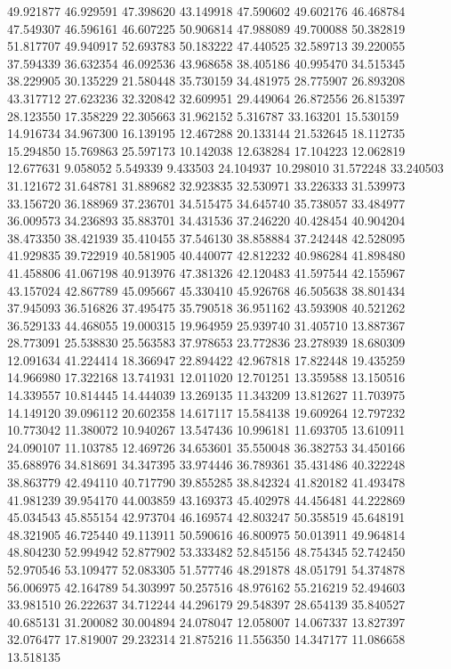49.921877
46.929591
47.398620
43.149918
47.590602
49.602176
46.468784
47.549307
46.596161
46.607225
50.906814
47.988089
49.700088
50.382819
51.817707
49.940917
52.693783
50.183222
47.440525
32.589713
39.220055
37.594339
36.632354
46.092536
43.968658
38.405186
40.995470
34.515345
38.229905
30.135229
21.580448
35.730159
34.481975
28.775907
26.893208
43.317712
27.623236
32.320842
32.609951
29.449064
26.872556
26.815397
28.123550
17.358229
22.305663
31.962152
5.316787
33.163201
15.530159
14.916734
34.967300
16.139195
12.467288
20.133144
21.532645
18.112735
15.294850
15.769863
25.597173
10.142038
12.638284
17.104223
12.062819
12.677631
9.058052
5.549339
9.433503
24.104937
10.298010
31.572248
33.240503
31.121672
31.648781
31.889682
32.923835
32.530971
33.226333
31.539973
33.156720
36.188969
37.236701
34.515475
34.645740
35.738057
33.484977
36.009573
34.236893
35.883701
34.431536
37.246220
40.428454
40.904204
38.473350
38.421939
35.410455
37.546130
38.858884
37.242448
42.528095
41.929835
39.722919
40.581905
40.440077
42.812232
40.986284
41.898480
41.458806
41.067198
40.913976
47.381326
42.120483
41.597544
42.155967
43.157024
42.867789
45.095667
45.330410
45.926768
46.505638
38.801434
37.945093
36.516826
37.495475
35.790518
36.951162
43.593908
40.521262
36.529133
44.468055
19.000315
19.964959
25.939740
31.405710
13.887367
28.773091
25.538830
25.563583
37.978653
23.772836
23.278939
18.680309
12.091634
41.224414
18.366947
22.894422
42.967818
17.822448
19.435259
14.966980
17.322168
13.741931
12.011020
12.701251
13.359588
13.150516
14.339557
10.814445
14.444039
13.269135
11.343209
13.812627
11.703975
14.149120
39.096112
20.602358
14.617117
15.584138
19.609264
12.797232
10.773042
11.380072
10.940267
13.547436
10.996181
11.693705
13.610911
24.090107
11.103785
12.469726
34.653601
35.550048
36.382753
34.450166
35.688976
34.818691
34.347395
33.974446
36.789361
35.431486
40.322248
38.863779
42.494110
40.717790
39.855285
38.842324
41.820182
41.493478
41.981239
39.954170
44.003859
43.169373
45.402978
44.456481
44.222869
45.034543
45.855154
42.973704
46.169574
42.803247
50.358519
45.648191
48.321905
46.725440
49.113911
50.590616
46.800975
50.013911
49.964814
48.804230
52.994942
52.877902
53.333482
52.845156
48.754345
52.742450
52.970546
53.109477
52.083305
51.577746
48.291878
48.051791
54.374878
56.006975
42.164789
54.303997
50.257516
48.976162
55.216219
52.494603
33.981510
26.222637
34.712244
44.296179
29.548397
28.654139
35.840527
40.685131
31.200082
30.004894
24.078047
12.058007
14.067337
13.827397
32.076477
17.819007
29.232314
21.875216
11.556350
14.347177
11.086658
13.518135
